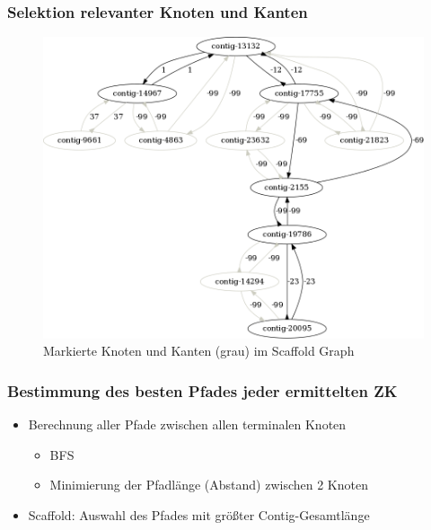 \documentclass[xcolor=pst]{beamer}
\begin{document}
\begin{frame}
  \frametitle{Selektion relevanter Knoten und Kanten}
  \begin{center}
    \begin{figure}
      \includegraphics[width=\textwidth,height=0.7\textheight,keepaspectratio]{figures/s_cerevisiae_filter_example_small.png}
      \caption{Markierte Knoten und Kanten (grau) im Scaffold Graph}
    \end{figure}
  \end{center}
\end{frame}

\begin{frame}
  \frametitle{Bestimmung des besten Pfades jeder ermittelten ZK}
  \begin{itemize}
    \item Berechnung aller Pfade zwischen allen terminalen Knoten
    \begin{itemize}
      \item BFS
      \item Minimierung der Pfadlänge (Abstand) zwischen 2 Knoten
    \end{itemize}
    \item Scaffold: Auswahl des Pfades mit größter Contig-Gesamtlänge
  \end{itemize}
\end{frame}
\end{document}
